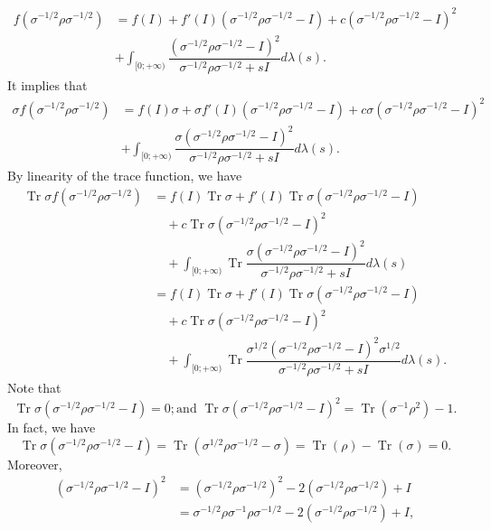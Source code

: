 \documentclass[10pt,reqno]{amsart}
\theoremstyle{break-italic}
\theoremstyle{break-italic}
\theoremstyle{break-italic}
\theoremstyle{break-italic}
\theoremstyle{break-italic}
\theoremstyle{break-italic}
\theoremstyle{break-italic}
\theoremstyle{break-italic}
\theoremstyle{break-roman}
\theoremstyle{standard}
\theoremstyle{varthm-roman}
\theoremstyle{varthm-italic}
\theoremstyle{varthm-roman-break}
\theoremstyle{varthm-italic-break}
\theoremstyle{varthm-roman-no-punctuation}
\theoremstyle{varthm-italic-no-punctuation}
\numberwithin{equation}{section}
\begin{document}
\begin{align*}
f\left(\sigma^{-1/2}\rho\sigma^{-1/2}\right)&=f(I)+f'(I)\left(\sigma^{-1/2}\rho\sigma^{-1/2}-I\right)+c\left(\sigma^{-1/2}\rho\sigma^{-1/2}-I\right)^2\\
&+\int_{[0;+\infty)} \dfrac{\left(\sigma^{-1/2}\rho\sigma^{-1/2}-I\right)^2}{\sigma^{-1/2}\rho\sigma^{-1/2}+sI} d\lambda(s).
\end{align*}
It implies that
\begin{align*}
\sigma f\left(\sigma^{-1/2}\rho\sigma^{-1/2}\right)&=f(I)\sigma+\sigma f'(I)\left(\sigma^{-1/2}\rho\sigma^{-1/2}-I\right)+c\sigma\left(\sigma^{-1/2}\rho\sigma^{-1/2}-I\right)^2\\
&+\int_{[0;+\infty)} \dfrac{\sigma\left(\sigma^{-1/2}\rho\sigma^{-1/2}-I\right)^2}{\sigma^{-1/2}\rho\sigma^{-1/2}+sI} d\lambda(s).
\end{align*}
By linearity of the  trace function, we have
\begin{align*}
\operatorname{Tr}\sigma f\left(\sigma^{-1/2}\rho\sigma^{-1/2}\right)&=f(I)\operatorname{Tr}\sigma+f'(I)\operatorname{Tr}\sigma \left(\sigma^{-1/2}\rho\sigma^{-1/2}-I\right)\\
&\quad+c\operatorname{Tr}\sigma\left(\sigma^{-1/2}\rho\sigma^{-1/2}-I\right)^2\\
&\quad+\int_{[0;+\infty)}\operatorname{Tr} \dfrac{\sigma\left(\sigma^{-1/2}\rho\sigma^{-1/2}-I\right)^2}{\sigma^{-1/2}\rho\sigma^{-1/2}+sI} d\lambda(s)\\
&=f(I)\operatorname{Tr}\sigma+f'(I)\operatorname{Tr}\sigma \left(\sigma^{-1/2}\rho\sigma^{-1/2}-I\right)\\
&\quad+c\operatorname{Tr}\sigma\left(\sigma^{-1/2}\rho\sigma^{-1/2}-I\right)^2\\
&\quad+\int_{[0;+\infty)}\operatorname{Tr} \dfrac{\sigma^{1/2}\left(\sigma^{-1/2}\rho\sigma^{-1/2}-I\right)^2\sigma^{1/2}}{\sigma^{-1/2}\rho\sigma^{-1/2}+sI} d\lambda(s).
\end{align*}
Note that 
\begin{equation} \label{claim1}
\operatorname{Tr}\sigma \left(\sigma^{-1/2}\rho\sigma^{-1/2}-I\right)=0; \mbox{and } 
\operatorname{Tr}\sigma \left(\sigma^{-1/2}\rho\sigma^{-1/2}-I\right)^2=\operatorname{Tr}\left(\sigma^{-1}\rho^2\right)-1.
\end{equation}
In fact, we have 
$$
\operatorname{Tr}\sigma \left(\sigma^{-1/2}\rho\sigma^{-1/2}-I\right)=\operatorname{Tr} \left(\sigma^{1/2}\rho\sigma^{-1/2}-\sigma\right)=\operatorname{Tr}(\rho)-\operatorname{Tr}(\sigma)=0.
$$
Moreover,
\begin{align*}
\left(\sigma^{-1/2}\rho\sigma^{-1/2}-I\right)^2 &= \left(\sigma^{-1/2}\rho\sigma^{-1/2}\right)^2 - 2\left(\sigma^{-1/2}\rho\sigma^{-1/2}\right) + I\\
&= \sigma^{-1/2}\rho\sigma^{-1}\rho\sigma^{-1/2} - 2\left(\sigma^{-1/2}\rho\sigma^{-1/2}\right) + I,
\end{align*}
\end{document}
